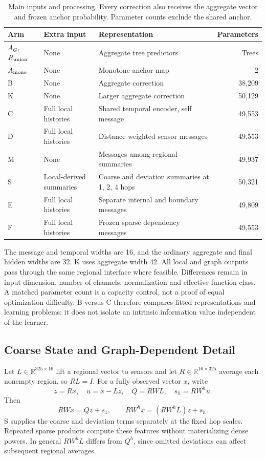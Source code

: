 \documentclass{llncs}
\begin{document}
\begin{table}[t]
\caption{Main inputs and processing. Every correction also receives the aggregate vector and frozen anchor probability. Parameter counts exclude the shared anchor.}
\label{tab:inputs}
\small
\begin{tabularx}{\textwidth}{l l >{\raggedright\arraybackslash}X r}
\toprule
Arm & Extra input & Representation & Parameters\\
\midrule
$A_G$, $R_{\rm union}$ & None & Aggregate tree predictors & Trees\\
$A_{\rm mono}$ & None & Monotone anchor map & 2\\
B & None & Aggregate correction & 38,209\\
K & None & Larger aggregate correction & 50,129\\
C & Full local histories & Shared temporal encoder, self message & 49,553\\
D & Full local histories & Distance-weighted sensor messages & 49,553\\
M & None & Messages among regional summaries & 49,937\\
S & \shortstack[l]{Local-derived\\summaries} & Coarse and deviation summaries at 1, 2, 4 hops & 50,321\\
E & Full local histories & Separate internal and boundary messages & 49,809\\
F & Full local histories & Frozen sparse dependency messages & 49,553\\
\bottomrule
\end{tabularx}
\end{table}

The message and temporal widths are 16, and the ordinary aggregate and final hidden widths are 32. K uses aggregate width 42. All local and graph outputs pass through the same regional interface where feasible. Differences remain in input dimension, number of channels, normalization and effective function class. A matched parameter count is a capacity control, not a proof of equal optimization difficulty. B versus C therefore compares fitted representations and learning problems; it does not isolate an intrinsic information value independent of the learner.

\subsection{Coarse State and Graph-Dependent Detail}
Let $L\in\mathbb{R}^{325\times16}$ lift a regional vector to sensors and let $R\in\mathbb{R}^{16\times325}$ average each nonempty region, so $RL=I$. For a fully observed vector $x$, write
\begin{equation}
 z=Rx,\quad u=x-Lz,\quad Q=RWL,\quad s_h=RW^hu.
\end{equation}
Then
\begin{equation}
 RWx=Qz+s_1,\qquad RW^hx=(RW^hL)z+s_h.
\label{eq:decomposition}
\end{equation}
S supplies the coarse and deviation terms separately at the fixed hop scales. Repeated sparse products compute these features without materializing dense powers. In general $RW^hL$ differs from $Q^h$, since omitted deviations can affect subsequent regional averages.
\end{document}
